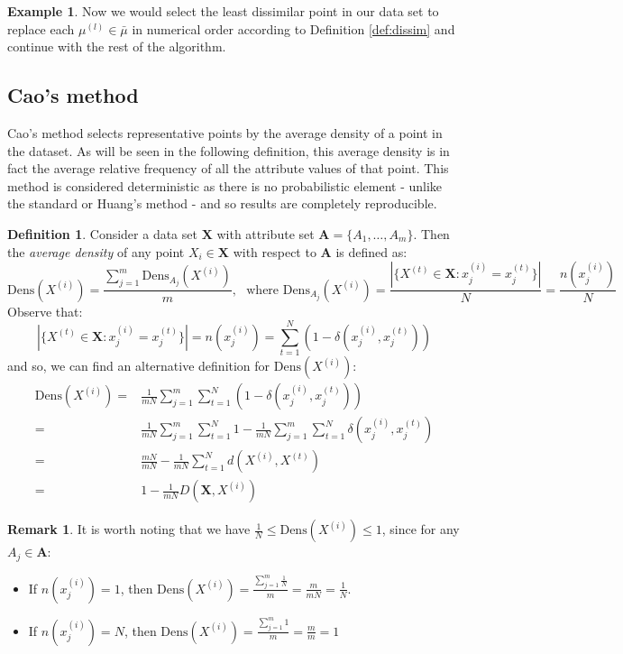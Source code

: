 \documentclass{article}
\theoremstyle{definition}
\newtheorem{definition}{Definition}[section]
\newtheorem{example}{Example}
\newtheorem*{remark}{Remark}
\begin{document}
\begin{example}
	Now we would select the least dissimilar point in our data set to replace each $\mu^{(l)} \in \bar{\mu}$ in numerical order according to Definition \ref{def:dissim} and continue with the rest of the algorithm. \\
\end{example}


\subsection{Cao's method}\label{subsection:cao}

Cao's method selects representative points by the average density of a point in the dataset. As will be seen in the following definition, this average density is in fact the average relative frequency of all the attribute values of that point. This method is considered deterministic as there is no probabilistic element - unlike the standard or Huang's method - and so results are completely reproducible.


\begin{definition}\label{def:density}	
Consider a data set $\textbf{X}$ with attribute set $\textbf{A} = \{A_1, \ldots, A_m\}$. Then the \emph{average density} of any point $X_i \in \textbf{X}$ with respect to $\textbf{A}$ is defined \cite{Cao09} as:
\[
	\text{Dens}(X^{(i)}) = \frac{\sum_{j=1}^m \text{Dens}_{A_j}(X^{(i)})}{m}, \ \ \ \text{where \ Dens}_{A_j}(X^{(i)}) = \frac{|\{X^{(t)} \in \textbf{X} : x_j^{(i)} = x_j^{(t)}\}|}{N} = \frac{n(x_j^{(i)})}{N}
\]
Observe that:
\[
	|\{X^{(t)} \in \textbf{X} : x_j^{(i)} = x_j^{(t)}\}| = n(x_j^{(i)}) = \sum_{t=1}^N (1 - \delta(x_j^{(i)}, x_j^{(t)}))
\]	
and so, we can find an alternative definition for $\text{Dens}(X^{(i)})$:
\begin{equation}
\begin{aligned}
	\text{Dens}(X^{(i)}) = {} & {} \frac{1}{mN} \sum_{j=1}^m \sum_{t=1}^N (1 - \delta(x_j^{(i)}, x_j^{(t)})) \\
			     = {} & {} \frac{1}{mN} \sum_{j=1}^m \sum_{t=1}^N 1 - \frac{1}{mN} \sum_{j=1}^m \sum_{t=1}^N \delta(x_j^{(i)}, x_j^{(t)}) \\
      			     = {} & {} \frac{mN}{mN} - \frac{1}{mN} \sum_{t=1}^N d(X^{(i)}, X^{(t)}) \\
			     = {} & {} 1 - \frac{1}{mN} D(\textbf{X}, X^{(i)})
\end{aligned}
\end{equation}
\end{definition}	

\begin{remark}
It is worth noting that we have $ \frac{1}{N} \leq \text{Dens}(X^{(i)}) \leq 1$, since for any $A_j \in \textbf{A}$:		

\begin{itemize}	
	\item If $n(x_j^{(i)}) = 1$, then $\text{Dens}(X^{(i)}) = \frac{\sum_{j=1}^m \frac{1}{N}}{m} = \frac{m}{mN} = \frac{1}{N}$.
	\item If $n(x_j^{(i)}) = N$, then $\text{Dens}(X^{(i)}) = \frac{\sum_{j=1}^m 1}{m} = \frac{m}{m} = 1$\end{itemize}
\end{remark}
\end{document}
